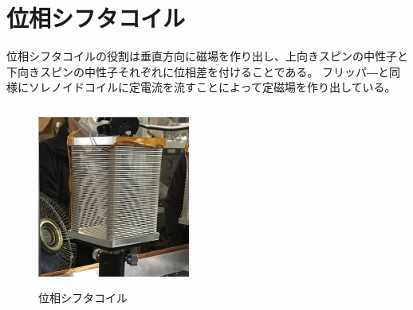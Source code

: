 \section{位相シフタコイル}
位相シフタコイルの役割は垂直方向に磁場を作り出し、上向きスピンの中性子と下向きスピンの中性子それぞれに位相差を付けることである。
フリッパ―と同様にソレノイドコイルに定電流を流すことによって定磁場を作り出している。
\begin{figure}[H]
\centering
\includegraphics[width=5cm,height=6cm]{device/shifterphoto.pdf}\caption{位相シフタコイル}
\end{figure}